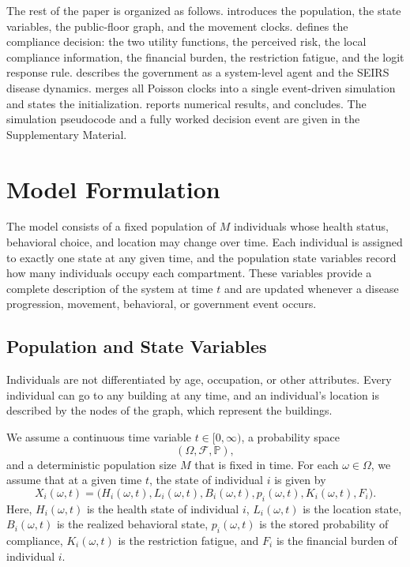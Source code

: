 \documentclass[11pt]{article}
\theoremstyle{definition}
\theoremstyle{plain}
\begin{document}
The rest of the paper is organized as follows.  introduces the population, the state variables, the public-floor graph, and the movement clocks.  defines the compliance decision: the two utility functions, the perceived risk, the local compliance information, the financial burden, the restriction fatigue, and the logit response rule.  describes the government as a system-level agent and the SEIRS disease dynamics.  merges all Poisson clocks into a single event-driven simulation and states the initialization.  reports numerical results, and  concludes. The simulation pseudocode and a fully worked decision event are given in the Supplementary Material.


\section{Model Formulation}
\label{sec:model}

The model consists of a fixed population of $M$ individuals whose health status, behavioral choice, and location may change over time. Each individual is assigned to exactly one state at any given time, and the population state variables record how many individuals occupy each compartment. These variables provide a complete description of the system at time $t$ and are updated whenever a disease progression, movement, behavioral, or government event occurs.

\subsection{Population and State Variables}
\label{sec:population}

Individuals are not differentiated by age, occupation, or other attributes. Every individual can go to any building at any time, and an individual's location is described by the nodes of the graph, which represent the buildings.

We assume a continuous time variable \(t\in[0,\infty)\), a probability space
\[
(\Omega,\mathcal F,\mathbb P),
\]
and a deterministic population size \(M\) that is fixed in time. For each \(\omega\in\Omega\),
we assume that at a given time \(t\), the state of individual \(i\) is given by
\[
X_i(\omega,t)
=
\big(H_i(\omega,t),L_i(\omega,t),B_i(\omega,t),p_i(\omega,t),K_i(\omega,t),F_i\big).
\]
Here, \(H_i(\omega,t)\) is the health state of individual \(i\), \(L_i(\omega,t)\) is the location
state, \(B_i(\omega,t)\) is the realized behavioral state, \(p_i(\omega,t)\) is the stored
probability of compliance, \(K_i(\omega,t)\) is the restriction fatigue, and \(F_i\) is the
financial burden of individual \(i\).
\end{document}
